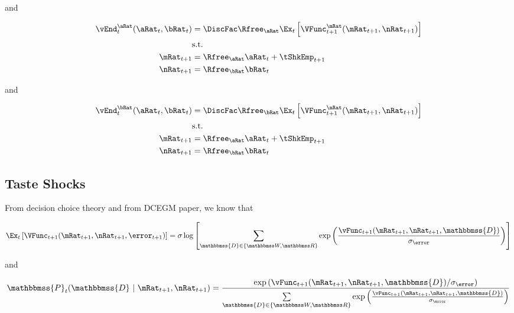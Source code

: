 \documentclass[\econtexRoot/SequentialEGM]{subfiles}
\begin{document}
and

\begin{equation}
  \begin{split}
    \vEnd_{t}^{\aRat}(\aRat_{t}, \bRat_{t}) & =  \DiscFac
    \Rfree_{\aRat} \Ex_{t} \left[ \VFunc^{\mRat}_{t+1}(\mRat_{t+1},
      \nRat_{t+1})
      \right] \\
    & \text{s.t.} \\
    \mRat_{t+1} & = \Rfree_{\aRat} \aRat_{t} + \tShkEmp_{t+1} \\
    \nRat_{t+1} & = \Rfree_{\bRat} \bRat_{t}
  \end{split}
\end{equation}

and

\begin{equation}
  \begin{split}
    \vEnd_{t}^{\bRat}(\aRat_{t}, \bRat_{t}) & =  \DiscFac
    \Rfree_{\bRat} \Ex_{t} \left[ \VFunc^{\nRat}_{t+1}(\mRat_{t+1},
      \nRat_{t+1})
      \right] \\
    & \text{s.t.} \\
    \mRat_{t+1} & = \Rfree_{\aRat} \aRat_{t} + \tShkEmp_{t+1} \\
    \nRat_{t+1} & = \Rfree_{\bRat} \bRat_{t}
  \end{split}
\end{equation}

\subsection{Taste Shocks}

From decision choice theory and from DCEGM paper, we know that

\providecommand{\Decision}{\ensuremath{\mathbbmss{D}}}

\begin{equation}
  \Ex_{t} \left[
    \VFunc_{t+1}(\mRat_{t+1}, \nRat_{t+1}, \error_{t+1}) \right] =
  \sigma \log \left[ \sum_{\Decision \in \{\Work, \Retire\}} \exp \left(
    \frac{\vFunc_{t+1}(\mRat_{t+1}, \nRat_{t+1},
      \Decision)}{\sigma_\error}	\right) 	\right]
\end{equation}

and

\providecommand{\Prob}{\ensuremath{\mathbbmss{P}}}

\begin{equation}
  \Prob_{t}(\Decision ~ \lvert ~ \mRat_{t+1}, \nRat_{t+1}) = \frac{\exp
    \left(
    \vFunc_{t + 1}(\mRat_{t+1}, \nRat_{t+1}, \Decision) /
    \sigma_\error
    \right)
  }{  \sum\limits_{\Decision \in \{\Work, \Retire\}}	\exp \left(
    \frac{\vFunc_{t+1}(\mRat_{t+1}, \nRat_{t+1},
      \Decision)}{\sigma_\error}	\right)}
\end{equation}
\end{document}
